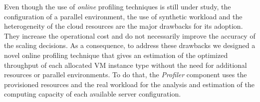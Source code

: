 
Even though the use of \emph{online} profiling techniques is still under study, the configuration of a parallel environment, the use of synthetic workload and the heterogeneity of the cloud resources are the major drawbacks for its adoption. They increase the operational cost and do not necessarily improve the accuracy of the scaling decisions. As a consequence, to address these drawbacks we designed a novel online profiling technique that gives an estimation of the optimized throughput of each allocated VM instance type without the need for additional resources or parallel environments. To do that, the \emph{Profiler} component uses the provisioned resources and the real workload for the analysis and estimation of the computing capacity of each available server configuration.





